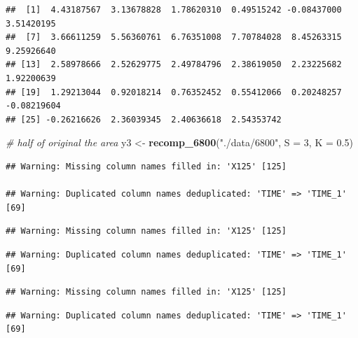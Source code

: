 \documentclass[
]{krantz}
\makeatletter
\newenvironment{Shaded}{\begin{snugshade}}{\end{snugshade}}
\newcommand{\CommentTok}[1]{\textcolor[rgb]{0.56,0.35,0.01}{\textit{#1}}}
\newcommand{\DataTypeTok}[1]{\textcolor[rgb]{0.13,0.29,0.53}{#1}}
\newcommand{\DecValTok}[1]{\textcolor[rgb]{0.00,0.00,0.81}{#1}}
\newcommand{\FloatTok}[1]{\textcolor[rgb]{0.00,0.00,0.81}{#1}}
\newcommand{\KeywordTok}[1]{\textcolor[rgb]{0.13,0.29,0.53}{\textbf{#1}}}
\newcommand{\NormalTok}[1]{#1}
\newcommand{\OperatorTok}[1]{\textcolor[rgb]{0.81,0.36,0.00}{\textbf{#1}}}
\newcommand{\StringTok}[1]{\textcolor[rgb]{0.31,0.60,0.02}{#1}}
\newenvironment{kframe}{%
\medskip{}
\setlength{\fboxsep}{.8em}
 \def\at@end@of@kframe{}%
 \ifinner\ifhmode%
  \def\at@end@of@kframe{\end{minipage}}%
  \begin{minipage}{\columnwidth}%
 \fi\fi%
 \def\FrameCommand##1{\hskip\@totalleftmargin \hskip-\fboxsep
 \colorbox{shadecolor}{##1}\hskip-\fboxsep
     \hskip-\linewidth \hskip-\@totalleftmargin \hskip\columnwidth}%
 \MakeFramed {\advance\hsize-\width
   \@totalleftmargin\z@ \linewidth\hsize
   \@setminipage}}%
 {\par\unskip\endMakeFramed%
 \at@end@of@kframe}
\renewenvironment{Shaded}{\begin{kframe}}{\end{kframe}}
\makeatother
\begin{document}
\begin{Shaded}
\end{Shaded}

\begin{verbatim}
##  [1]  4.43187567  3.13678828  1.78620310  0.49515242 -0.08437000  3.51420195
##  [7]  3.66611259  5.56360761  6.76351008  7.70784028  8.45263315  9.25926640
## [13]  2.58978666  2.52629775  2.49784796  2.38619050  2.23225682  1.92200639
## [19]  1.29213044  0.92018214  0.76352452  0.55412066  0.20248257 -0.08219604
## [25] -0.26216626  2.36039345  2.40636618  2.54353742
\end{verbatim}

\begin{Shaded}
\begin{Highlighting}[]
\CommentTok{\# half of original the area}
\NormalTok{y3 \textless{}{-}}\StringTok{ }\KeywordTok{recomp\_6800}\NormalTok{(}\StringTok{"./data/6800"}\NormalTok{, }\DataTypeTok{S =} \DecValTok{3}\NormalTok{, }\DataTypeTok{K =} \FloatTok{0.5}\NormalTok{)}
\end{Highlighting}
\end{Shaded}

\begin{verbatim}
## Warning: Missing column names filled in: 'X125' [125]

## Warning: Duplicated column names deduplicated: 'TIME' => 'TIME_1' [69]
\end{verbatim}

\begin{verbatim}
## Warning: Missing column names filled in: 'X125' [125]
\end{verbatim}

\begin{verbatim}
## Warning: Duplicated column names deduplicated: 'TIME' => 'TIME_1' [69]
\end{verbatim}

\begin{verbatim}
## Warning: Missing column names filled in: 'X125' [125]
\end{verbatim}

\begin{verbatim}
## Warning: Duplicated column names deduplicated: 'TIME' => 'TIME_1' [69]
\end{verbatim}
\end{document}
